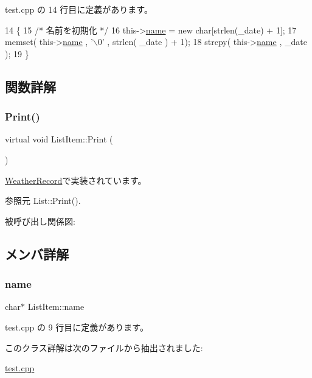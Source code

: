  test.\+cpp の 14 行目に定義があります。


\begin{DoxyCode}
14                                \{
15         \textcolor{comment}{/* 名前を初期化 */}
16         this->\hyperlink{class_list_item_a721391bcdefb1a5f77b79295a80b0305}{name} = \textcolor{keyword}{new} \textcolor{keywordtype}{char}[strlen(\_date) + 1];
17         memset( this->\hyperlink{class_list_item_a721391bcdefb1a5f77b79295a80b0305}{name} , \textcolor{charliteral}{'\(\backslash\)0'} , strlen( \_date ) + 1);
18         strcpy( this->\hyperlink{class_list_item_a721391bcdefb1a5f77b79295a80b0305}{name} , \_date );
19     \}
\end{DoxyCode}


\subsection{関数詳解}
\mbox{\label{class_list_item_a0bb35843489312a6796d6f94f4395399}} 
\subsubsection{\texorpdfstring{Print()}{Print()}}
{\footnotesize\ttfamily virtual void List\+Item\+::\+Print (\begin{DoxyParamCaption}{ }\end{DoxyParamCaption})\hspace{0.3cm}{\ttfamily [pure virtual]}}



\hyperlink{class_weather_record_a824790f08728d4deb81dfcbaec5a76ba}{Weather\+Record}で実装されています。



参照元 List\+::\+Print().

被呼び出し関係図\+:


\subsection{メンバ詳解}
\mbox{\label{class_list_item_a721391bcdefb1a5f77b79295a80b0305}} 
\subsubsection{\texorpdfstring{name}{name}}
{\footnotesize\ttfamily char$\ast$ List\+Item\+::name}



 test.\+cpp の 9 行目に定義があります。



このクラス詳解は次のファイルから抽出されました\+:\begin{DoxyCompactItemize}
\item 
\hyperlink{test_8cpp}{test.\+cpp}\end{DoxyCompactItemize}
